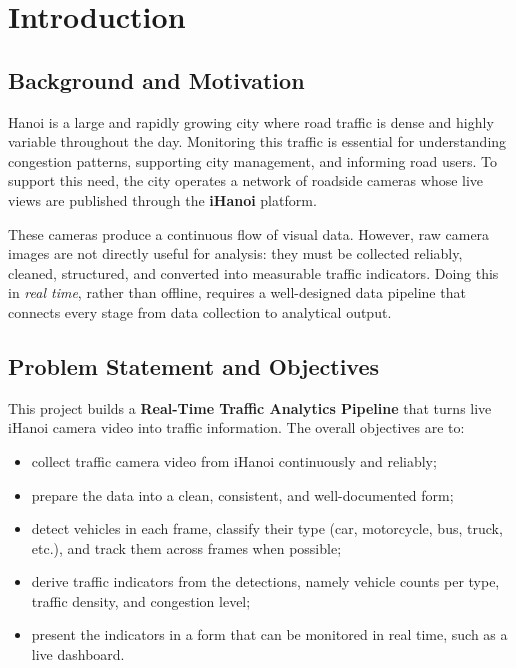 \documentclass[12pt,a4paper]{article}
\begin{document}
\section{Introduction}
\label{sec:intro}

\subsection{Background and Motivation}
Hanoi is a large and rapidly growing city where road traffic is dense and
highly variable throughout the day. Monitoring this traffic is essential for
understanding congestion patterns, supporting city management, and informing
road users. To support this need, the city operates a network of roadside
cameras whose live views are published through the \textbf{iHanoi} platform.

These cameras produce a continuous flow of visual data. However, raw camera
images are not directly useful for analysis: they must be collected reliably,
cleaned, structured, and converted into measurable traffic indicators. Doing
this in \emph{real time}, rather than offline, requires a well-designed data
pipeline that connects every stage from data collection to analytical output.

\subsection{Problem Statement and Objectives}
This project builds a \textbf{Real-Time Traffic Analytics Pipeline} that turns
live iHanoi camera video into traffic information. The overall objectives are to:
\begin{itemize}
  \item collect traffic camera video from iHanoi continuously and reliably;
  \item prepare the data into a clean, consistent, and well-documented form;
  \item detect vehicles in each frame, classify their type (car, motorcycle,
        bus, truck, etc.), and track them across frames when possible;
  \item derive traffic indicators from the detections, namely vehicle counts
        per type, traffic density, and congestion level;
  \item present the indicators in a form that can be monitored in real time,
        such as a live dashboard.
\end{itemize}
\end{document}
